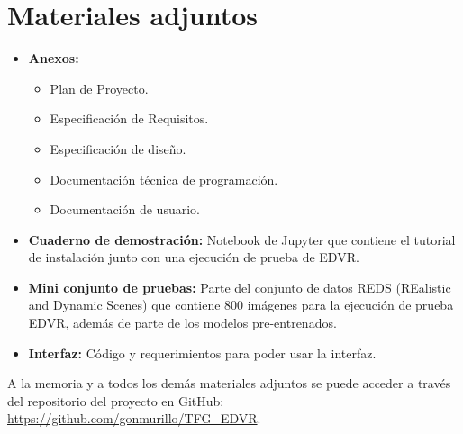 \section{Materiales adjuntos}
\begin{itemize}	
	\item \textbf{Anexos:}
	\begin{itemize}
		\item Plan de Proyecto.
		\item Especificación de Requisitos.
		\item Especificación de diseño.
		\item Documentación técnica de programación.
		\item Documentación de usuario.
	\end{itemize}
	\item \textbf{Cuaderno de demostración:} Notebook de Jupyter que contiene el tutorial de instalación junto con una ejecución de prueba de EDVR.
	\item \textbf{Mini conjunto de pruebas:} Parte del conjunto de datos REDS (REalistic and Dynamic Scenes) que contiene 800 imágenes para la ejecución de prueba EDVR, además de parte de los modelos pre-entrenados.
	\item \textbf{Interfaz:} Código y requerimientos para poder usar la interfaz.
\end{itemize}

A la memoria y a todos los demás materiales adjuntos se puede acceder a través del repositorio del proyecto en GitHub: \url{https://github.com/gonmurillo/TFG_EDVR}. 